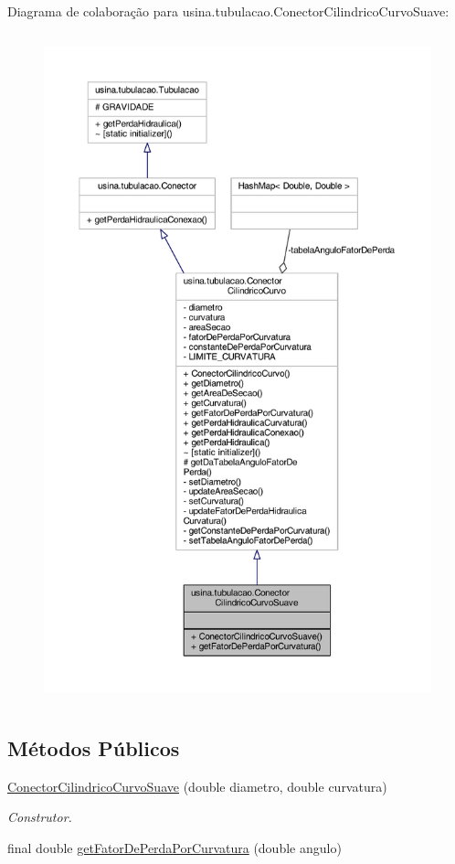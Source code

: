 Diagrama de colaboração para usina.\-tubulacao.\-Conector\-Cilindrico\-Curvo\-Suave\-:
\nopagebreak
\begin{figure}[H]
\begin{center}
\leavevmode
\includegraphics[height=550pt]{classusina_1_1tubulacao_1_1_conector_cilindrico_curvo_suave__coll__graph}
\end{center}
\end{figure}
\subsection*{Métodos Públicos}
\begin{DoxyCompactItemize}
\item 
\hyperlink{classusina_1_1tubulacao_1_1_conector_cilindrico_curvo_suave_a2c8cc6975cd18869d1524a4edc1f19db}{Conector\-Cilindrico\-Curvo\-Suave} (double diametro, double curvatura)
\begin{DoxyCompactList}\small\item\em Construtor. \end{DoxyCompactList}\item 
final double \hyperlink{classusina_1_1tubulacao_1_1_conector_cilindrico_curvo_suave_a6de53dc8bcead270bcfd0a2e5f9a010d}{get\-Fator\-De\-Perda\-Por\-Curvatura} (double angulo)
\end{DoxyCompactItemize}


